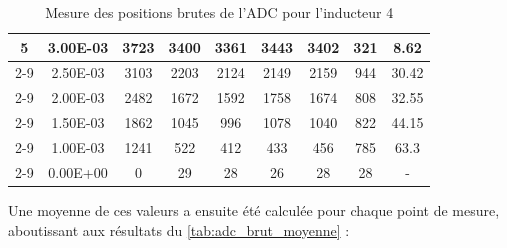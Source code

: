 \begin{table}[H]
{\begin{tabular}{|c|c|c|c|c|c|c|c|c|}
            \multirow{6}{*}{5} & 3.00E-03         & 3723      & 3400                                                       & 3361                                                      & 3443                                                      & 3402    & 321    & 8.62                                                               \\ \cline{2-9}
                               & 2.50E-03         & 3103      & 2203                                                       & 2124                                                      & 2149                                                      & 2159    & 944    & 30.42                                                              \\ \cline{2-9}
                               & 2.00E-03         & 2482      & 1672                                                       & 1592                                                      & 1758                                                      & 1674    & 808    & 32.55                                                              \\ \cline{2-9}
                               & 1.50E-03         & 1862      & 1045                                                       & 996                                                       & 1078                                                      & 1040    & 822    & 44.15                                                              \\ \cline{2-9}
                               & 1.00E-03         & 1241      & 522                                                        & 412                                                       & 433                                                       & 456     & 785    & 63.3                                                               \\ \cline{2-9}
                               & 0.00E+00         & 0         & 29                                                         & 28                                                        & 26                                                        & 28      & 28     & -                                                                  \\ \hline
        \end{tabular}%
    }
    \caption{Mesure des positions brutes de l'ADC pour l'inducteur 4}
    \label{tab:adc_brut_inducteur4}
\end{table}

Une moyenne de ces valeurs a ensuite été calculée pour chaque point de mesure, aboutissant aux résultats du \autoref{tab:adc_brut_moyenne} :

